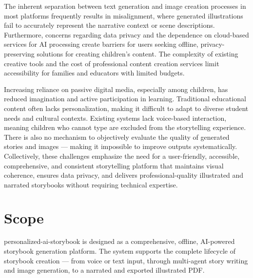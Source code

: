 The inherent separation between text generation and image creation processes in most platforms frequently results in misalignment, where generated illustrations fail to accurately represent the narrative context or scene descriptions. Furthermore, concerns regarding data privacy and the dependence on cloud-based services for AI processing create barriers for users seeking offline, privacy-preserving solutions for creating children's content. The complexity of existing creative tools and the cost of professional content creation services limit accessibility for families and educators with limited budgets.

Increasing reliance on passive digital media, especially among children, has reduced imagination and active participation in learning. Traditional educational content often lacks personalization, making it difficult to adapt to diverse student needs and cultural contexts. Existing systems lack voice-based interaction, meaning children who cannot type are excluded from the storytelling experience. There is also no mechanism to objectively evaluate the quality of generated stories and images — making it impossible to improve outputs systematically. Collectively, these challenges emphasize the need for a user-friendly, accessible, comprehensive, and consistent storytelling platform that maintains visual coherence, ensures data privacy, and delivers professional-quality illustrated and narrated storybooks without requiring technical expertise.


\section{Scope}

personalized-ai-storybook is designed as a comprehensive, offline, AI-powered storybook generation platform. The system supports the complete lifecycle of storybook creation — from voice or text input, through multi-agent story writing and image generation, to a narrated and exported illustrated PDF.

